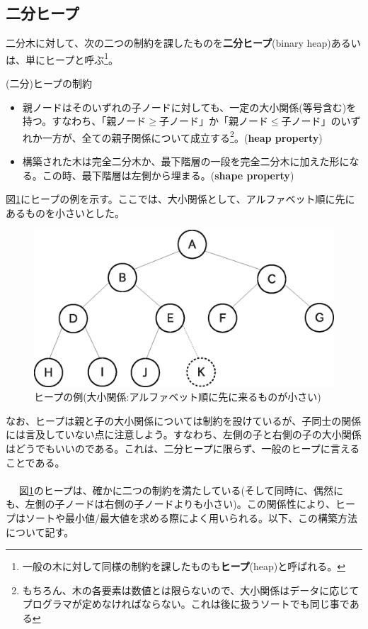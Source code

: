 \subsection{二分ヒープ}
二分木に対して、次の二つの制約を課したものを\textbf{二分ヒープ}(binary heap)あるいは、単にヒープと呼ぶ\footnote{一般の木に対して同様の制約を課したものも\textbf{ヒープ}(heap)と呼ばれる。}。
\begin{itembox}[l]{(二分)ヒープの制約}
\begin{itemize}
\item 親ノードはそのいずれの子ノードに対しても、一定の大小関係(等号含む)を持つ。すなわち、「親ノード$\ge$子ノード」か「親ノード$\le$子ノード」のいずれか一方が、全ての親子関係について成立する\footnote{もちろん、木の各要素は数値とは限らないので、大小関係はデータに応じてプログラマが定めなければならない。これは後に扱うソートでも同じ事である}。(\textbf{heap property})
\item 構築された木は完全二分木か、最下階層の一段を完全二分木に加えた形になる。この時、最下階層は左側から埋まる。(\textbf{shape property})
\end{itemize}
\end{itembox}

図\ref{heap}にヒープの例を示す。ここでは、大小関係として、アルファベット順に先にあるものを小さいとした。
\begin{figure}[htb]
\centering
\includegraphics[width=0.8\linewidth,keepaspectratio]{fig13_4.eps}
\caption{ヒープの例(大小関係:アルファベット順に先に来るものが小さい)}\label{heap}
\end{figure}

なお、ヒープは親と子の大小関係については制約を設けているが、子同士の関係には言及していない点に注意しよう。すなわち、左側の子と右側の子の大小関係はどうでもいいのである。これは、二分ヒープに限らず、一般のヒープに言えることである。
\\ \\　
図\ref{heap}のヒープは、確かに二つの制約を満たしている(そして同時に、偶然にも、左側の子ノードは右側の子ノードよりも小さい)。この関係性により、ヒープはソートや最小値/最大値を求める際によく用いられる。以下、この構築方法について記す。

